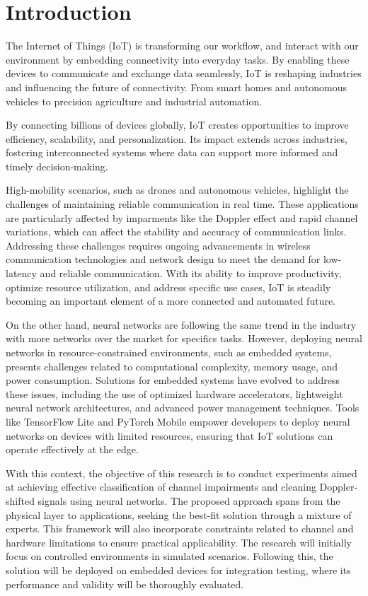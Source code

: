 \section{Introduction}

The Internet of Things (IoT) is transforming our workflow, and interact with our environment by embedding connectivity into everyday tasks. By enabling these devices to communicate and exchange data seamlessly, IoT is reshaping industries and influencing the future of connectivity. From smart homes and autonomous vehicles to precision agriculture and industrial automation.

By connecting billions of devices globally, IoT creates opportunities to improve efficiency, scalability, and personalization. Its impact extends across industries, fostering interconnected systems where data can support more informed and timely decision-making.

High-mobility scenarios, such as drones and autonomous vehicles, highlight the challenges of maintaining reliable communication in real time. These applications are particularly affected by imparments like the Doppler effect and rapid channel variations, which can affect the stability and accuracy of communication links. Addressing these challenges requires ongoing advancements in wireless communication technologies and network design to meet the demand for low-latency and reliable communication. With its ability to improve productivity, optimize resource utilization, and address specific use cases, IoT is steadily becoming an important element of a more connected and automated future. 

On the other hand, neural networks are following the same trend in the industry with more networks over the market for specifics tasks. However, deploying neural networks in resource-constrained environments, such as embedded systems, presents challenges related to computational complexity, memory usage, and power consumption. Solutions for embedded systems have evolved to address these issues, including the use of optimized hardware accelerators, lightweight neural network architectures, and advanced power management techniques. Tools like TensorFlow Lite and PyTorch Mobile empower developers to deploy neural networks on devices with limited resources, ensuring that IoT solutions can operate effectively at the edge.

With this context, the objective of this research is to conduct experiments aimed at achieving effective classification of channel impairments and cleaning Doppler-shifted signals using neural networks. The proposed approach spans from the physical layer to applications, seeking the best-fit solution through a mixture of experts. This framework will also incorporate constraints related to channel and hardware limitations to ensure practical applicability. The research will initially focus on controlled environments in simulated scenarios. Following this, the solution will be deployed on embedded devices for integration testing, where its performance and validity will be thoroughly evaluated.
